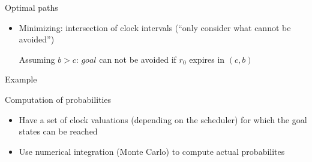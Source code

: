 \documentclass[aspectratio=169]{beamer}
\begin{document}
\begin{frame}{Optimal paths}
\begin{minipage}[t]{.6\linewidth}
{\begin{itemize}
        \item Minimizing: intersection of clock intervals (\enquote{only consider what cannot be avoided})

        {\scriptsize Assuming $b > c$: $\mathit{goal}$ can not be avoided if $r_0$ expires in $(c,b)$}

    \end{itemize}
    }%
  \end{minipage}%
  \begin{minipage}[t]{.4\linewidth}
    Example

    \centering

    \only<2>{}%
    \only<3>{}%
  \end{minipage}%

\end{frame}


\begin{frame}{Computation of probabilities}

  \begin{itemize}
    \item Have a set of clock valuations (depending on the scheduler) for which the goal states can be reached
    \item Use numerical integration (Monte Carlo) to compute actual probabilites
  \end{itemize}

\end{frame}

\end{document}
